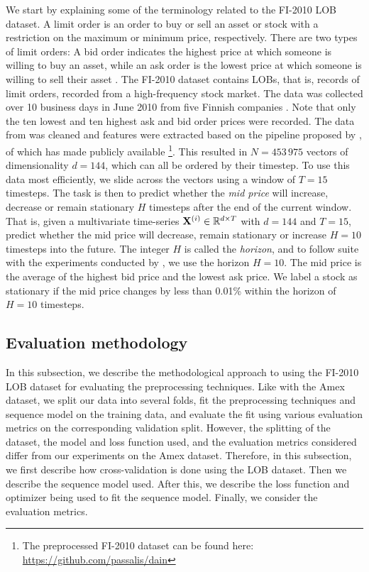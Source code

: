 \documentclass{statsmsc}
\begin{document}
{We start by explaining some of the terminology related to the FI-2010 \ac{LOB} dataset.
A limit order is an order to buy or sell an asset or stock with a restriction on the maximum
or minimum price, respectively.
There are two types of limit orders: A bid order indicates the highest price at
which someone is willing to buy an asset, while an ask order is the lowest
price at which someone is willing to sell their asset \citep{gould2013limit}.
The FI-2010 dataset contains \acp{LOB}, that is,
records of limit orders, recorded from a high-frequency stock market.
The data was collected over 10 business days in June 2010
from five Finnish companies \citep{lob-data}. Note
that only the ten lowest and ten highest ask and bid order prices were recorded.
The data from \cite{lob-data} was cleaned and features were extracted based on the pipeline
proposed by \cite{lob_preprocess}, of which \cite{dain} has made publicly available%
\footnote{The preprocessed FI-2010 dataset can be found here: \url{https://github.com/passalis/dain}}.
%
This resulted in $N=453\,975$ vectors of dimensionality $d=144$, which can all be ordered by their
timestep.
To use this data most efficiently, we slide across the vectors using a window of
$T=15$ timesteps.
The task is then to predict whether the \textit{mid price} will increase, decrease or remain
stationary $H$ timesteps after the end of the current window. That is, given a multivariate
time-series $\mathbf{X}^{(i)} \in \mathbb{R}^{d \times T}$ with $d=144$ and $T=15$, predict whether the
mid price will decrease, remain stationary or increase $H=10$ timesteps into the future.
The integer $H$ is called the
\textit{horizon}, and to follow suite with the experiments conducted by \cite{dain},
we use the horizon $H=10$.
The mid price is the average of the highest bid price and the lowest ask price. We label a stock
as stationary if the mid price changes by less than 0.01\% within the horizon of $H=10$ timesteps.



\subsection{Evaluation methodology}%
\label{sec:lob_meth}

In this subsection, we describe the methodological approach to using the FI-2010 \ac{LOB}
dataset for evaluating the preprocessing techniques. Like with the Amex dataset, we split our
data into several folds, fit the preprocessing techniques and sequence model on the training
data, and evaluate the fit using various evaluation metrics on the corresponding validation split.
However, the splitting of the dataset, the model and loss function used, and the evaluation metrics
considered differ from our experiments on the Amex dataset. Therefore, in this subsection, we first
describe how cross-validation is done using the \ac{LOB} dataset. Then we describe the sequence
model used. After this, we describe the loss function and optimizer being used to fit the sequence
model. Finally, we consider the evaluation metrics.

}
\end{document}
